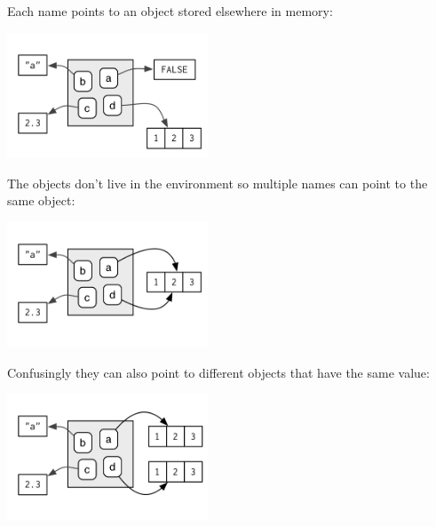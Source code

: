 Each name points to an object stored elsewhere in memory:

\begin{Shaded}
\begin{Highlighting}[]
\StringTok{ }\NormalTok{()}
\StringTok{ }
\StringTok{ }
\StringTok{ }\NormalTok{:}
\end{Highlighting}
\end{Shaded}

\includegraphics[width=2.36in]{diagrams/environments.png/bindings.png}

The objects don't live in the environment so multiple names can point to
the same object:

\begin{Shaded}
\begin{Highlighting}[]
\StringTok{ }
\end{Highlighting}
\end{Shaded}

\includegraphics[width=2.36in]{diagrams/environments.png/multiple-names.png}

Confusingly they can also point to different objects that have the same
value:

\begin{Shaded}
\begin{Highlighting}[]
\StringTok{ }\NormalTok{:}
\end{Highlighting}
\end{Shaded}

\includegraphics[width=2.36in]{diagrams/environments.png/copies.png}

